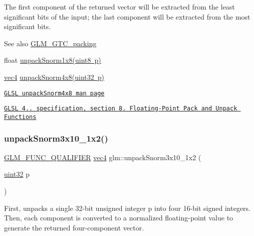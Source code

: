 The first component of the returned vector will be extracted from the least significant bits of the input; the last component will be extracted from the most significant bits.

\begin{DoxySeeAlso}{See also}
\mbox{\hyperlink{group__gtc__packing}{G\+L\+M\+\_\+\+G\+T\+C\+\_\+packing}} 

float \mbox{\hyperlink{group__gtc__packing_ga6f2bebf536fbf7c8b97d4b306bb3354e}{unpack\+Snorm1x8(uint8 p)}} 

\mbox{\hyperlink{group__core__types_ga5881b1b022d7fd1b7218f5916532dd02}{vec4}} \mbox{\hyperlink{group__core__func__packing_ga2db488646d48b7c43d3218954523fe82}{unpack\+Snorm4x8(uint32 p)}} 

\href{http://www.opengl.org/sdk/docs/manglsl/xhtml/unpackSnorm4x8.xml}{\tt G\+L\+SL unpack\+Snorm4x8 man page} 

\href{http://www.opengl.org/registry/doc/GLSLangSpec.4.20.8.pdf}{\tt G\+L\+SL 4.. specification, section 8. Floating-\/\+Point Pack and Unpack Functions} 
\end{DoxySeeAlso}
\mbox{\label{group__gtc__packing_ga8b8bb827a3743ca553d8702d3e337101}} 
\subsubsection{\texorpdfstring{unpack\+Snorm3x10\+\_\+1x2()}{unpackSnorm3x10\_1x2()}}
{\footnotesize\ttfamily \mbox{\hyperlink{setup_8hpp_a33fdea6f91c5f834105f7415e2a64407}{G\+L\+M\+\_\+\+F\+U\+N\+C\+\_\+\+Q\+U\+A\+L\+I\+F\+I\+ER}} \mbox{\hyperlink{group__core__types_ga5881b1b022d7fd1b7218f5916532dd02}{vec4}} glm\+::unpack\+Snorm3x10\+\_\+1x2 (\begin{DoxyParamCaption}\item[{\mbox{\hyperlink{group__gtc__type__precision_ga202b6a53c105fcb7e531f9b443518451}{uint32}}}]{p }\end{DoxyParamCaption})}

First, unpacks a single 32-\/bit unsigned integer p into four 16-\/bit signed integers. Then, each component is converted to a normalized floating-\/point value to generate the returned four-\/component vector.

